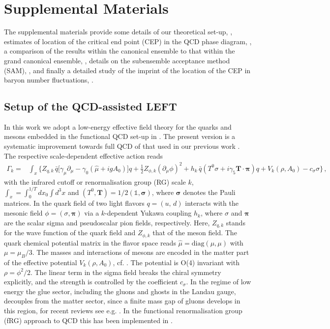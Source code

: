 \documentclass[reprint,twocolumn,superscriptaddress,preprintnumbers,amsmath,amssymb,aps,prd,floatfix]{revtex4-2}
\begin{document}
\section*{Supplemental Materials}
The supplemental materials provide some details of our theoretical set-up, , estimates of location of the critical end point (CEP) in the QCD phase diagram, , a comparison of the results within the canonical ensemble to that within the grand canonical ensemble, , details on the subensemble acceptance method (SAM), , and finally a detailed study of the imprint of the location of the CEP in baryon number fluctuations, . 


\subsection{Setup of the QCD-assisted LEFT}
\label{app:setup}

In this work we adopt a low-energy effective field theory for the quarks and mesons embedded in the functional QCD set-up in \cite{Fu:2019hdw}. The present version is a systematic improvement towards full QCD of that used in our previous work \cite{Fu:2021oaw}. The respective scale-dependent effective action  reads 
%
\begin{align}
    \Gamma_k=&\int_x \Biggl\{Z_{q,k}\,\bar{q} \Big [\gamma_\mu \partial_\mu -\gamma_0(\hat\mu+i g A_0) \Big ]q+\frac{1}{2}Z_{\phi,k}(\partial_\mu \phi)^2 +h_k\,\bar{q}\left(T^0\sigma+i\gamma_5\bm T\cdot\bm{\pi}\right)q +V_k(\rho,A_0)- c_\sigma \sigma \Biggr\}\,,
    \label{eq:action}
\end{align}
%
with the infrared cutoff or renormalisation group (RG) scale $k$, $\int_{x}=\int_0^{1/T}d x_0 \int d^3 x$ and $(T^0,\bm T)=1/2 (\mathbb{1}, \bm \sigma)$, where $\bm \sigma$ denotes the Pauli matrices. In  the quark field of two light flavors $q=(u,\,d)$ interacts with the mesonic field $\phi=(\sigma, \bm\pi)$ via a $k$-dependent Yukawa coupling $h_k$, where $\sigma$ and $\bm\pi$ are the scalar sigma and pseudoscalar pion fields, respectively. Here, $Z_{q,k}$ stands for the wave function of the quark field and $Z_{\phi,k}$ that of the meson field. The quark chemical potential matrix in the flavor space reads $\hat\mu = \mathrm{diag}(\mu,\mu)$ with $\mu=\mu_B/3$. The masses and interactions of mesons are encoded in the matter part of the effective potential $V_k(\rho,A_0)$, cf. . The potential is O(4) invariant with $\rho = \phi^2/2$. The linear term in the sigma field breaks the chiral symmetry explicitly, and the strength is controlled by the coefficient $c_\sigma$. In the regime of low energy the glue sector, including the gluons and ghosts in the Landau gauge, decouples from the matter sector, since a finite mass gap of gluons develops in this region, for recent reviews see e.g. \cite{Papavassiliou:2022wrb, Fischer:2018sdj, Dupuis:2020fhh, Fu:2022gou}. In the functional renormalisation group (fRG) approach to QCD this has been implemented in \cite{Mitter:2014wpa, Braun:2014ata, Cyrol:2016tym, Cyrol:2017ewj, Fu:2019hdw}. 
\end{document}
